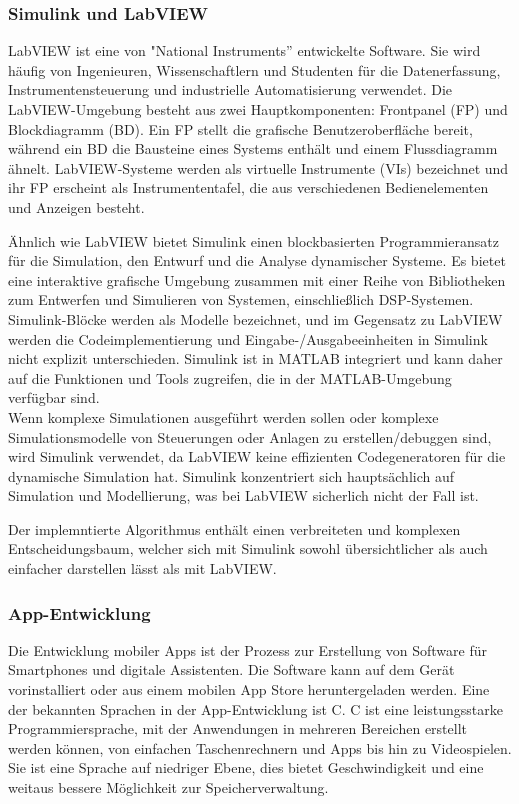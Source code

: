 \subsubsection{Simulink und LabVIEW} 
LabVIEW ist eine von "National Instruments'' entwickelte Software. Sie wird häufig von Ingenieuren, Wissenschaftlern und Studenten für die Datenerfassung, Instrumentensteuerung und industrielle Automatisierung verwendet. Die LabVIEW-Umgebung besteht aus zwei Hauptkomponenten: Frontpanel (FP) und Blockdiagramm (BD). Ein FP stellt die grafische Benutzeroberfläche bereit, während ein BD die Bausteine eines Systems enthält und einem Flussdiagramm ähnelt. LabVIEW-Systeme werden als virtuelle Instrumente (VIs) bezeichnet und ihr FP erscheint als Instrumententafel, die aus verschiedenen Bedienelementen und Anzeigen besteht.

Ähnlich wie LabVIEW bietet Simulink einen blockbasierten Programmieransatz für die Simulation, den Entwurf und die Analyse dynamischer Systeme. Es bietet eine interaktive grafische Umgebung zusammen mit einer Reihe von Bibliotheken zum Entwerfen und Simulieren von Systemen, einschließlich DSP-Systemen. Simulink-Blöcke werden als Modelle bezeichnet, und im Gegensatz zu LabVIEW werden die Codeimplementierung und Eingabe-/Ausgabeeinheiten in Simulink nicht explizit unterschieden. Simulink ist in MATLAB integriert und kann daher auf die Funktionen und Tools zugreifen, die in der MATLAB-Umgebung verfügbar sind. \citep{Kehtarnavaz2006} \citep{Cansalar2015}\\


Wenn komplexe Simulationen ausgeführt werden sollen oder komplexe Simulationsmodelle von Steuerungen oder Anlagen zu erstellen/debuggen sind, wird Simulink verwendet, da LabVIEW keine effizienten Codegeneratoren für die dynamische Simulation hat.
Simulink konzentriert sich hauptsächlich auf Simulation und Modellierung, was bei LabVIEW sicherlich nicht der Fall ist.

Der implemntierte Algorithmus enthält einen verbreiteten und komplexen Entscheidungsbaum, welcher sich mit Simulink sowohl übersichtlicher als auch einfacher darstellen lässt als mit LabVIEW.



\subsubsection{App-Entwicklung}
Die Entwicklung mobiler Apps ist der Prozess zur Erstellung von Software für Smartphones und digitale Assistenten. Die Software kann auf dem Gerät vorinstalliert oder aus einem mobilen App Store heruntergeladen werden. Eine der bekannten Sprachen in der App-Entwicklung ist C.
C ist eine leistungsstarke Programmiersprache, mit der Anwendungen in mehreren Bereichen erstellt werden können, von einfachen Taschenrechnern und Apps bis hin zu Videospielen. Sie ist eine Sprache auf niedriger Ebene, dies bietet Geschwindigkeit und eine weitaus bessere Möglichkeit zur Speicherverwaltung.

